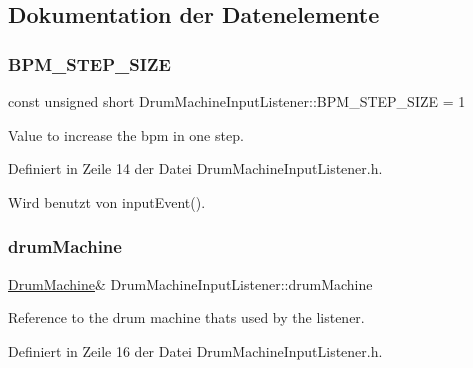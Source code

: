 \subsection{Dokumentation der Datenelemente}
\mbox{\label{class_drum_machine_input_listener_ad4f83d21be6ff1ba703a27d8c9a04c9a}} 
\subsubsection{\texorpdfstring{B\+P\+M\+\_\+\+S\+T\+E\+P\+\_\+\+S\+I\+ZE}{BPM\_STEP\_SIZE}}
{\footnotesize\ttfamily const unsigned short Drum\+Machine\+Input\+Listener\+::\+B\+P\+M\+\_\+\+S\+T\+E\+P\+\_\+\+S\+I\+ZE = 1\hspace{0.3cm}{\ttfamily [private]}}



Value to increase the bpm in one step. 



Definiert in Zeile 14 der Datei Drum\+Machine\+Input\+Listener.\+h.



Wird benutzt von input\+Event().

\mbox{\label{class_drum_machine_input_listener_ae3f80aad0a5c4b2e4ad2712423102feb}} 
\subsubsection{\texorpdfstring{drum\+Machine}{drumMachine}}
{\footnotesize\ttfamily \hyperlink{class_drum_machine}{Drum\+Machine}\& Drum\+Machine\+Input\+Listener\+::drum\+Machine\hspace{0.3cm}{\ttfamily [private]}}



Reference to the drum machine thats used by the listener. 



Definiert in Zeile 16 der Datei Drum\+Machine\+Input\+Listener.\+h.



